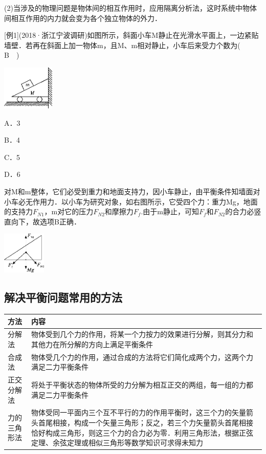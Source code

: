 (2)当涉及的物理问题是物体间的相互作用时，应用隔离分析法，这时系统中物体间相互作用的内力就会变为各个独立物体的外力．

{[}例1{]}(2018·浙江宁波调研)如图所示，斜面小车M静止在光滑水平面上，一边紧贴墙壁．若再在斜面上加一物体m，且M、m相对静止，小车后来受力个数为(　B　)

\begin{center}\includegraphics[width=0.97917in,height=0.83333in]{media/image82.png}\end{center}

A．3 

B．4

C．5 

D．6
\begin{solution}
	对M和m整体，它们必受到重力和地面支持力，因小车静止，由平衡条件知墙面对小车必无作用力．以小车为研究对象，如右图所示，它受四个力：重力Mg，地面的支持力$F_{N1}$，m对它的压力$F_{N2}$和摩擦力$F_f$.由于m静止，可知$F_f$和$F_{N2}$的合力必竖直向下，故选项B正确．
\end{solution}

\begin{center}\includegraphics[width=0.8125in,height=0.79167in]{media/image83.png}\end{center}
\newpage
\subsection{解决平衡问题常用的方法}

\begin{longtable}[]{@{}m{2.5cm}m{10.5cm}@{}}
\toprule
方法 & 内容\tabularnewline
\midrule
\endhead
分解法 &
物体受到几个力的作用，将某一个力按力的效果进行分解，则其分力和其他力在所分解的方向上满足平衡条件\tabularnewline
合成法 &
物体受几个力的作用，通过合成的方法将它们简化成两个力，这两个力满足二力平衡条件\tabularnewline
正交分解法 &
将处于平衡状态的物体所受的力分解为相互正交的两组，每一组的力都满足二力平衡条件\tabularnewline
力的三角形法 &
物体受同一平面内三个互不平行的力的作用平衡时，这三个力的矢量箭头首尾相接，构成一个矢量三角形；反之，若三个力矢量箭头首尾相接恰好构成三角形，则这三个力的合力必为零．利用三角形法，根据正弦定理、余弦定理或相似三角形等数学知识可求得未知力\tabularnewline
\bottomrule
\end{longtable}

